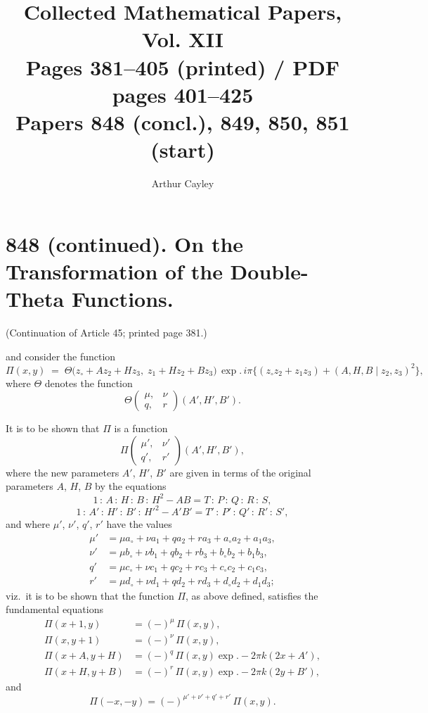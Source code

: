 \documentclass[11pt]{article}
\title{Collected Mathematical Papers, Vol. XII\\ \large Pages 381--405 (printed) / PDF pages 401--425\\ Papers 848 (concl.), 849, 850, 851 (start)}
\author{Arthur Cayley}
\date{}
\begin{document}
\maketitle

\section*{848 (continued). On the Transformation of the Double-Theta Functions.}

\noindent (Continuation of Article 45; printed page 381.)

\medskip

\noindent and consider the function
\[
\Pi(x,y) \;=\; \Theta\bigl(z_{\circ}+Az_2+Hz_3,\; z_1+Hz_2+Bz_3\bigr)\,\exp.\,i\pi\{(z_{\circ}z_2+z_1z_3)+(A,H,B\mid z_2,z_3)^2\},
\]
where $\Theta$ denotes the function
\[
\Theta\!\begin{pmatrix} \mu, & \nu \\ q, & r \end{pmatrix}\!(A',H',B').
\]

It is to be shown that $\Pi$ is a function
\[
\Pi\!\begin{pmatrix} \mu', & \nu' \\ q', & r' \end{pmatrix}\!(A',H',B'),
\]
where the new parameters $A'$, $H'$, $B'$ are given in terms of the original parameters $A$, $H$, $B$ by the equations
\[
1 \,:\, A \,:\, H \,:\, B \,:\, H^2-AB = T \,:\, P \,:\, Q \,:\, R \,:\, S,
\]
\[
1 \,:\, A' \,:\, H' \,:\, B' \,:\, H'^2-A'B' = T' \,:\, P' \,:\, Q' \,:\, R' \,:\, S',
\]
and where $\mu'$, $\nu'$, $q'$, $r'$ have the values
\begin{align*}
\mu' &= \mu a_{\circ}+\nu a_1+q a_2+r a_3+a_{\circ}a_2+a_1a_3,\\
\nu' &= \mu b_{\circ}+\nu b_1+q b_2+r b_3+b_{\circ}b_2+b_1b_3,\\
q'   &= \mu c_{\circ}+\nu c_1+q c_2+r c_3+c_{\circ}c_2+c_1c_3,\\
r'   &= \mu d_{\circ}+\nu d_1+q d_2+r d_3+d_{\circ}d_2+d_1d_3;
\end{align*}
viz.\ it is to be shown that the function $\Pi$, as above defined, satisfies the fundamental equations
\begin{align*}
\Pi(x+1,y) &= (-)^{\mu}\,\Pi(x,y),\\
\Pi(x,y+1) &= (-)^{\nu}\,\Pi(x,y),\\
\Pi(x+A,y+H) &= (-)^q\,\Pi(x,y)\exp.-2\pi k(2x+A'),\\
\Pi(x+H,y+B) &= (-)^r\,\Pi(x,y)\exp.-2\pi k(2y+B'),
\end{align*}
and
\[
\Pi(-x,-y) = (-)^{\mu'+\nu'+q'+r'}\,\Pi(x,y).
\]
\end{document}
